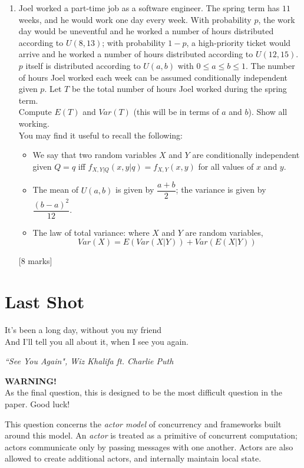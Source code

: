 \documentclass[12pt, a4paper]{article}
\begin{document}
\begin{enumerate}
\item Joel worked a part-time job as a software engineer. The spring term has $11$ weeks, and he would work one day every week. With probability $p$, the work day would be uneventful and he worked a number of hours distributed according to $U(8, 13)$; with probability $1 - p$, a high-priority ticket would arrive and he worked a number of hours distributed according to $U(12, 15)$. $p$ itself is distributed according to $U(a, b)$ with $0 \leq a \leq b \leq 1$. The number of hours Joel worked each week can be assumed conditionally independent given $p$. Let $T$ be the total number of hours Joel worked during the spring term.
\\[12pt]
Compute $E(T)$ and $Var(T)$ (this will be in terms of $a$ and $b$). Show all working.
\\[12pt]
You may find it useful to recall the following:
\begin{itemize}
\item We say that two random variables $X$ and $Y$ are conditionally independent given $Q = q$ iff $f_{X, Y | Q}(x, y | q) = f_{X, Y}(x, y)$ for all values of $x$ and $y$.
\item The mean of $U(a, b)$ is given by $\dfrac{a+b}{2}$; the variance is given by $\dfrac{(b-a)^2}{12}$.
\item The law of total variance: where $X$ and $Y$ are random variables,
$$
Var(X) = E(Var(X | Y)) + Var(E(X | Y))
$$
\end{itemize}
[8 marks]
\end{enumerate}

\newpage
\section{Last Shot}
\epigraph{It's been a long day, without you my friend \\
And I'll tell you all about it, when I see you again.
}{\textit{``See You Again", Wiz Khalifa ft. Charlie Puth}}
\begin{center}
\textbf{WARNING!} \\[11pt]
As the final question, this is designed to be the most difficult question in the paper. Good luck!
\end{center}
This question concerns the \textit{actor model} of concurrency and frameworks
built around this model. An \textit{actor} is treated as a primitive of concurrent
computation; actors communicate only by passing messages with one another.
Actors are also allowed to create additional actors, and internally maintain
local state.
\end{document}

